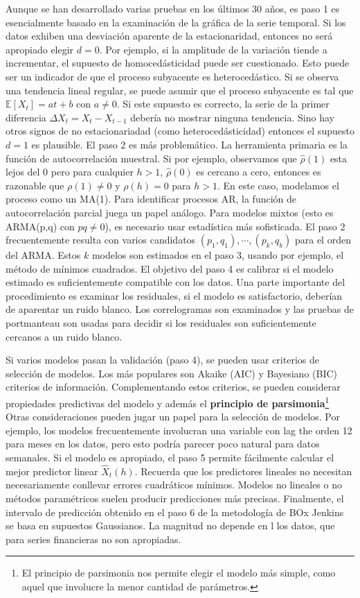 \documentclass[a4paper, 11pt]{article}
\begin{document}
Aunque se han desarrollado varias pruebas en los últimos 30 años, es paso 1 es esencialmente basado en la examinación de la gráfica de la serie temporal. Si los datos exhiben una desviación aparente de la estacionaridad, entonces no será apropiado elegir $d = 0$. Por ejemplo, si la amplitude de la variación tiende a incrementar, el supuesto de homocedásticidad puede ser cuestionado. Esto puede ser un indicador de que el proceso subyacente es heterocedástico. Si se observa una tendencia lineal regular, se puede asumir que el proceso subyacente es tal que $\mathbb{E}\left [X_t \right ] = at +b$ con $a\neq 0$. Si este supuesto es correcto, la serie de la primer diferencia $\Delta X_t = X_t - X_{t-1}$ debería no mostrar ninguna tendencia. Sino hay otros signos de no estacionariadad (como heterocedásticidad) entonces el supuesto $d = 1$ es plausible.
El paso 2 es más problemático. La herramienta primaria es la función de autocorrelación muestral. Si por ejemplo, observamos que $\hat{\rho}(1)$ esta lejos del 0 pero para cualquier $h >1$, $\hat{\rho}(0)$ es cercano a cero, entonces es razonable que $\rho(1) \neq 0$ y $\rho(h ) = 0$ para $h>1$. En este caso, modelamos el proceso como un MA(1). Para identificar procesos AR, la función de autocorrelación parcial juega un papel análogo. Para modelos mixtos (esto es ARMA(p,q) con $pq \neq 0$), es necesario usar estadística más sofisticada. El paso 2 frecuentemente resulta con varios candidatos $(p_1,q_1), \cdots, (p_k,q_k )$ para el orden del ARMA. Estos $k$ modelos son estimados en el paso 3, usando por ejemplo, el método de mínimos cuadrados. El objetivo del paso 4 es calibrar si el modelo estimado es suficientemente compatible con los datos. Una parte importante del procedimiento es examinar los residuales, si el modelo es satisfactorio, deberían de aparentar un ruido blanco. Los correlogramas son examinados y las pruebas de portmanteau son usadas para decidir si los residuales son suficientemente cercanos a un ruido blanco. 

Si varios modelos pasan la validación (paso 4), se pueden usar criterios de selección de modelos. Los más populares son Akaike (AIC) y Bayesiano (BIC) criterios de información. Complementando estos criterios, se pueden considerar propiedades predictivas del modelo y además el \textbf{principio de parsimonia}\footnote{El principio de parsimonia nos permite elegir el modelo más simple, como aquel que involucre la menor cantidad de parámetros.} Otras consideraciones pueden jugar un papel para la selección de modelos. Por ejemplo, los modelos frecuentemente involucran una variable con lag the orden 12 para meses en los datos, pero esto podría parecer poco natural para datos semanales. Si el modelo es apropiado, el paso 5 permite fácilmente calcular el mejor predictor linear $\hat{X}_t(h)$. Recuerda que los predictores lineales no necesitan necesariamente conllevar errores cuadráticos mínimos. Modelos no lineales o no métodos paramétricos suelen producir predicciones más precisas. Finalmente, el intervalo de predicción obtenido en el paso 6 de la metodología de BOx Jenkins se basa en supuestos Gaussianos. La magnitud no depende en l los datos, que para series financieras no son apropiadas.
\end{document}
